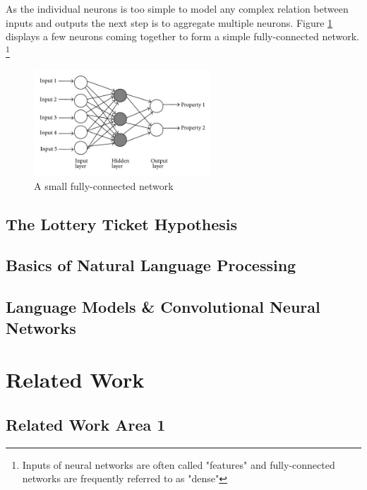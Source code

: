 As the individual neurons is too simple to model any complex relation between inputs
and outputs the next step is to aggregate multiple neurons. Figure \ref{fig:FFNetwork} displays a few neurons coming together to form a simple fully-connected network.
\footnote[2]{
	Inputs of neural networks are often called "features" and fully-connected networks are frequently referred to as "dense"	}
\begin{figure}
	\centering
		\includegraphics[height=150px]{gfx/Dense_FFNetwork.jpg}
		\caption{A small fully-connected network}
		\label{fig:FFNetwork}
\end{figure}




	
	
	
\section{The Lottery Ticket Hypothesis}

\section{Basics of Natural Language Processing}

\section{Language Models \& Convolutional Neural Networks}


\chapter{Related Work}
\label{ch:relatedwork}
\section{Related Work Area 1}

